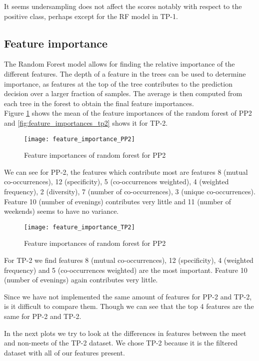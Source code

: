 It seems undersampling does not affect the scores notably with respect to the positive class, perhaps except for the RF model in TP-1.

\subsection{Feature importance}
The Random Forest model allows for finding the relative importance of the different features. The depth of a feature in the trees can be used to determine importance, as features at the top of the tree contributes to the prediction decision over a larger fraction of samples. The average is then computed from each tree in the forest to obtain the final feature importances.\\
Figure \ref{fig:feature_importances_pp2} shows the mean of the feature importances of the random forest of PP2 and \autoref{fig:feature_importances_tp2} shows it for TP-2. \\

\begin{figure}[H]
    \hspace*{-1.0cm}
    \centering
    \texttt{[image: feature\_importance\_PP2]}
    \caption{Feature importances of random forest for PP2}
    \label{fig:feature_importances_pp2}
\end{figure}
We can see for PP-2, the features which contribute most are features 8 (mutual co-occurrences), 12 (specificity), 5 (co-occurrences weighted), 4 (weighted frequency), 2 (diversity), 7 (number of co-occurrences), 3 (unique co-occurrences). Feature 10 (number of evenings) contributes very little and 11 (number of weekends) seems to have no variance.

\begin{figure}[H]
    \hspace*{-1.0cm}
    \centering
    \texttt{[image: feature\_importance\_TP2]}
    \caption{Feature importances of random forest for PP2}
    \label{fig:feature_importances_tp2}
\end{figure}
For TP-2 we find features 8 (mutual co-occurrences), 12 (specificity), 4 (weighted frequency) and 5 (co-occurrences weighted) are the most important. Feature 10 (number of evenings) again contributes very little. 

Since we have not implemented the same amount of features for PP-2 and TP-2, is it difficult to compare them. Though we can see that the top 4 features are the same for PP-2 and TP-2. 

In the next plots we try to look at the differences in features between the meet and non-meets of the TP-2 dataset. We chose TP-2 because it is the filtered dataset with all of our features present.

